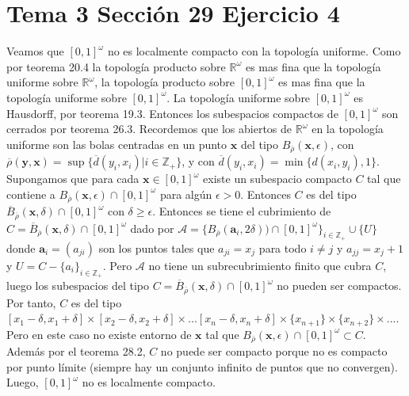 \documentclass{article}
\newcommand{\vect}[1]{\boldsymbol{#1}}
\begin{document}
\section{Tema 3 Sección 29 Ejercicio 4}
Veamos que $[0,1]^\omega$ no es localmente compacto con la topología uniforme. Como por teorema 20.4 la topología producto sobre $\mathbb{R}^\omega$ es mas fina  que la topología uniforme sobre $\mathbb{R}^\omega$, la topología producto sobre $[0,1]^\omega$ es mas fina que la topología uniforme sobre $[0,1]^\omega$. La topología uniforme sobre $[0,1]^\omega$ es Hausdorff, por teorema 19.3. Entonces los subespacios compactos de $[0,1]^\omega$ son cerrados por teorema 26.3. Recordemos que los abiertos de $\mathbb{R}^\omega$ en la topología uniforme son las bolas centradas en un punto $\vect{x}$ del tipo $B_{\overline{\rho}}(\vect{x},\epsilon)$, con $\overline{\rho}(\vect{y},\vect{x})=\sup\{\overline{d}(y_i,x_i)|i \in \mathbb{Z}_+\}$, y con $\overline{d}(y_i,x_i)=\min\{d(x_i,y_i),1\}$. Supongamos que para cada $\vect{x}\in[0,1]^\omega$ existe un subespacio compacto $C$ tal que contiene a $B_{\overline{\rho}}(\vect{x},\epsilon)\cap[0,1]^\omega$ para algún $\epsilon>0$. Entonces $C$ es del tipo $\overline{B}_{\overline{\rho}}(\vect{x},\delta)\cap [0,1]^\omega$ con $\delta\geq \epsilon$. Entonces se tiene el cubrimiento de $C=\overline{B}_{\overline{\rho}}(\vect{x},\delta)\cap [0,1]^\omega$ dado por $\mathcal{A}=\{B_{\overline{\rho}}(\vect{a}_i,2\delta))\cap[0,1]^\omega\}_{i\in \mathbb{Z}_+}\cup\{U\}$ donde $\vect{a}_i=(a_{ji})$ son los puntos tales que $a_{ji}=x_j$ para todo $i\neq j$ y $a_{jj}=x_j+1$ y $U=C-\{a_i\}_{i\in \mathbb{Z}_+}$. Pero $\mathcal{A}$ no tiene un subrecubrimiento finito que cubra $C$, luego los subespacios del tipo $C=\overline{B}_{\overline{\rho}}(\vect{x},\delta)\cap [0,1]^\omega$ no pueden ser compactos. Por tanto, $C$ es del tipo $[ x_1-\delta, x_1+\delta]\times [ x_2-\delta, x_2+\delta]\times ... [ x_{n}-\delta, x_n+\delta]\times \{x_{n+1}\}\times \{x_{n+2}\}\times...$. Pero en este caso no existe entorno de $\vect{x}$ tal que $B_{\overline{\rho}}(\vect{x},\epsilon)\cap[0,1]^\omega\subset C$. Además por el teorema 28.2, $C$ no puede ser compacto porque no es compacto por punto límite (siempre hay un conjunto infinito de puntos que no convergen). Luego, $[0,1]^{\omega}$ no es localmente compacto.
\end{document}
